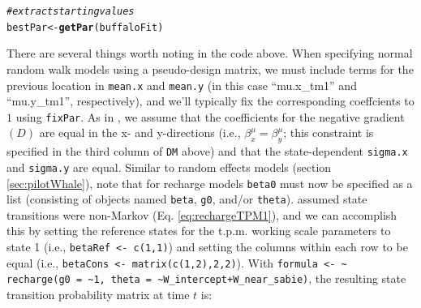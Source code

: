 \documentclass[12pt]{article}\usepackage[]{graphicx}\usepackage[]{xcolor}
\makeatletter
\newcommand{\hlcom}[1]{\textcolor[rgb]{0.678,0.584,0.686}{\textit{#1}}}%
\newcommand{\hlstd}[1]{\textcolor[rgb]{0.345,0.345,0.345}{#1}}%
\newcommand{\hlkwb}[1]{\textcolor[rgb]{0.69,0.353,0.396}{#1}}%
\newcommand{\hlkwd}[1]{\textcolor[rgb]{0.737,0.353,0.396}{\textbf{#1}}}%
\newenvironment{kframe}{%
 \def\at@end@of@kframe{}%
 \ifinner\ifhmode%
  \def\at@end@of@kframe{\end{minipage}}%
  \begin{minipage}{\columnwidth}%
 \fi\fi%
 \def\FrameCommand##1{\hskip\@totalleftmargin \hskip-\fboxsep
 \colorbox{shadecolor}{##1}\hskip-\fboxsep
     \hskip-\linewidth \hskip-\@totalleftmargin \hskip\columnwidth}%
 \MakeFramed {\advance\hsize-\width
   \@totalleftmargin\z@ \linewidth\hsize
   \@setminipage}}%
 {\par\unskip\endMakeFramed%
 \at@end@of@kframe}
\newenvironment{knitrout}{}{} %
\makeatother
\begin{document}
\begin{knitrout}
\begin{kframe}
{\ttfamily\noindent\itshape\color{messagecolor}{\#\# =======================================================================}}

{\ttfamily\noindent\itshape\color{messagecolor}{\#\# Fitting HMM with 2 states and 1 data stream}}

{\ttfamily\noindent\itshape\color{messagecolor}{\#\# -----------------------------------------------------------------------}}

{\ttfamily\noindent\itshape{}}

{\ttfamily\noindent\itshape{}}

{\ttfamily\noindent\itshape{}}

{\ttfamily\noindent\itshape\color{messagecolor}{\#\# =======================================================================}}

{\ttfamily\noindent\itshape\color{messagecolor}{\#\# DONE}}\begin{alltt}
\hlcom{# extract starting values}
\hlstd{bestPar} \hlkwb{<-} \hlkwd{getPar}\hlstd{(buffaloFit)}
\end{alltt}
\end{kframe}
\end{knitrout}
\noindent There are several things worth noting in the code above. When specifying normal random walk models using a pseudo-design matrix, we must include terms for the previous location in \verb|mean.x| and \verb|mean.y| (in this case ``mu.x\_tm1'' and ``mu.y\_tm1'', respectively), and we'll typically fix the corresponding coeffcients to $1$ using \verb|fixPar|. As in \cite{HootenEtAl2019}, we assume that the coefficients for the negative gradient $(D)$ are equal in the x- and y-directions (i.e., $\beta^\mu_x = \beta^\mu_y$; this constraint is specified in the third column of \verb|DM| above) and that the state-dependent \verb|sigma.x| and \verb|sigma.y| are equal. Similar to random effects models (section \ref{sec:pilotWhale}), note that for recharge models \verb|beta0| must now be specified as a list (consisting of objects named \verb|beta|, \verb|g0|, and/or \verb|theta|). \cite{HootenEtAl2019} assumed state transitions were non-Markov (Eq. \ref{eq:rechargeTPM1}), and we can accomplish this by setting the reference states for the t.p.m. working scale parameters to state 1 (i.e., \verb|betaRef <- c(1,1)|) and setting the columns within each row to be equal (i.e., \verb|betaCons <- matrix(c(1,2),2,2)|). With \verb|formula <- ~ recharge(g0 = ~1, theta = ~W_intercept+W_near_sabie)|, the resulting state transition probability matrix at time $t$ is:
\end{document}
